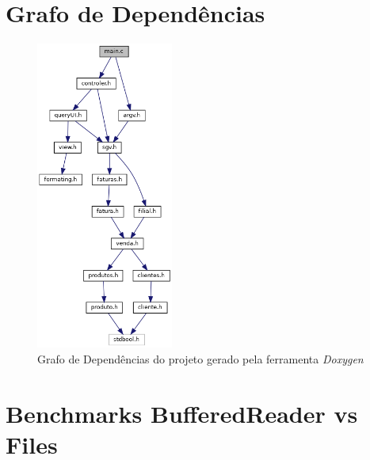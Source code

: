 \documentclass[a4paper]{report}
\begin{document}
\chapter{Grafo de Dependências}
\begin{figure}[H]
    \begin{center}
        \includegraphics[width=0.4\textwidth]{dependency.png}\par
        \caption{Grafo de Dependências do projeto gerado pela ferramenta \textit{Doxygen}}
    \end{center}
\end{figure}

\chapter{Benchmarks BufferedReader vs Files}
\end{document}

